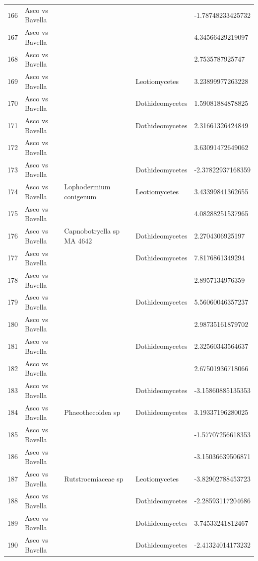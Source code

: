 \documentclass[12pt]{article}\usepackage[]{graphicx}\usepackage[]{color}
\numberwithin{figure}{section}
\begin{document}
\begin{table}[ht]
\begin{tabular}{lllll}
  166 & Asco vs Bavella &  &  & -1.78748233425732 \\ 
  167 & Asco vs Bavella &  &  & 4.34566429219097 \\ 
  168 & Asco vs Bavella &  &  & 2.7535787925747 \\ 
  169 & Asco vs Bavella &  & Leotiomycetes & 3.23899977263228 \\ 
  170 & Asco vs Bavella &  & Dothideomycetes & 1.59081884878825 \\ 
  171 & Asco vs Bavella &  & Dothideomycetes & 2.31661326424849 \\ 
  172 & Asco vs Bavella &  &  & 3.63091472649062 \\ 
  173 & Asco vs Bavella &  & Dothideomycetes & -2.37822937168359 \\ 
  174 & Asco vs Bavella & Lophodermium conigenum & Leotiomycetes & 3.43399841362655 \\ 
  175 & Asco vs Bavella &  &  & 4.08288251537965 \\ 
  176 & Asco vs Bavella & Capnobotryella sp MA 4642 & Dothideomycetes & 2.2704306925197 \\ 
  177 & Asco vs Bavella &  & Dothideomycetes & 7.8176861349294 \\ 
  178 & Asco vs Bavella &  &  & 2.8957134976359 \\ 
  179 & Asco vs Bavella &  & Dothideomycetes & 5.56060046357237 \\ 
  180 & Asco vs Bavella &  &  & 2.98735161879702 \\ 
  181 & Asco vs Bavella &  & Dothideomycetes & 2.32560343564637 \\ 
  182 & Asco vs Bavella &  &  & 2.67501936718066 \\ 
  183 & Asco vs Bavella &  & Dothideomycetes & -3.15860885135353 \\ 
  184 & Asco vs Bavella & Phaeothecoidea sp & Dothideomycetes & 3.19337196280025 \\ 
  185 & Asco vs Bavella &  &  & -1.57707256618353 \\ 
  186 & Asco vs Bavella &  &  & -3.15036639506871 \\ 
  187 & Asco vs Bavella & Rutstroemiaceae sp & Leotiomycetes & -3.82902788453723 \\ 
  188 & Asco vs Bavella &  & Dothideomycetes & -2.28593117204686 \\ 
  189 & Asco vs Bavella &  & Dothideomycetes & 3.74533241812467 \\ 
  190 & Asco vs Bavella &  & Dothideomycetes & -2.41324014173232 \\ 

\end{tabular}
\end{table}
\end{document}
